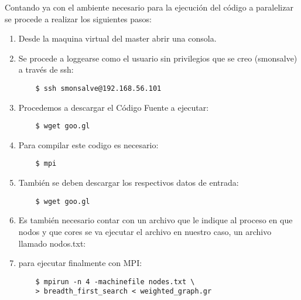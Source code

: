 Contando ya con el ambiente necesario para la ejecución del código a paralelizar se procede a realizar los siguientes pasos: 

\begin{enumerate}

	\item Desde la maquina virtual del master abrir una consola. 

	\item Se procede a loggearse como el usuario sin privilegios que se creo (smonsalve) a través de ssh:

	\begin{verbatim}
	$ ssh smonsalve@192.168.56.101
	\end{verbatim}

	\item Procedemos a descargar el Código Fuente a ejecutar: 

	\begin{verbatim}
	$ wget goo.gl 
	\end{verbatim}
	



	\item Para compilar este codigo es necesario:


	\begin{verbatim}
	$ mpi
	\end{verbatim}
	


	\item También se deben descargar los respectivos datos de entrada: 

	\begin{verbatim}
	$ wget goo.gl
	\end{verbatim}
	

	

	\item Es también necesario contar con un archivo que le indique al proceso en que nodos y que cores se va ejecutar el archivo en nuestro caso, un archivo llamado nodos.txt:

	

	\item para ejecutar finalmente con MPI: 


	\begin{verbatim}
	$ mpirun -n 4 -machinefile nodes.txt \
	> breadth_first_search < weighted_graph.gr
	\end{verbatim}
	

\end{enumerate}

